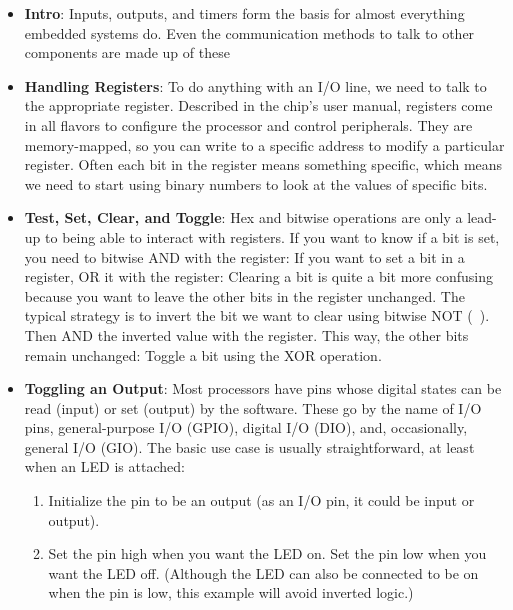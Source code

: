 \documentclass{report}
\begin{document}
    \pagebreak 
    \begin{itemize}
        \item \textbf{Intro}: Inputs, outputs, and timers form the basis for almost everything embedded systems do. Even the communication methods to talk to other components are made up of these        
        \item \textbf{Handling Registers}: To do anything with an I/O line, we need to talk to the appropriate register.
            \bigbreak \noindent 
            Described in the chip’s user manual, registers come in all flavors to configure the processor and control peripherals. They are memory-mapped, so you can write to a specific address to modify a particular register. Often each bit in the register means something specific, which means we need to start using binary numbers to look at the values of specific bits.
        \item \textbf{Test, Set, Clear, and Toggle}: Hex and bitwise operations are only a lead-up to being able to interact with registers. If you want to know if a bit is set, you need to bitwise AND with the register:
            \bigbreak \noindent 
            If you want to set a bit in a register, OR it with the register:
            \bigbreak \noindent 
            Clearing a bit is quite a bit more confusing because you want to leave the other bits in the register unchanged. The typical strategy is to invert the bit we want to clear using bitwise NOT (\string~\;). Then AND the inverted value with the register. This way, the other bits remain unchanged:
            \bigbreak \noindent 
            Toggle a bit using the XOR operation.
        \item \textbf{Toggling an Output}: Most processors have pins whose digital states can be read (input) or set (output) by the software. These go by the name of I/O pins, general-purpose I/O (GPIO), digital I/O (DIO), and, occasionally, general I/O (GIO). The basic use case is usually straightforward, at least when an LED is attached:
            \begin{enumerate}
                \item Initialize the pin to be an output (as an I/O pin, it could be input or output).
                \item Set the pin high when you want the LED on. Set the pin low when you want the LED off. (Although the LED can also be connected to be on when the pin is low, this example will avoid inverted logic.)
            \end{enumerate}

\end{itemize}
\end{document}
